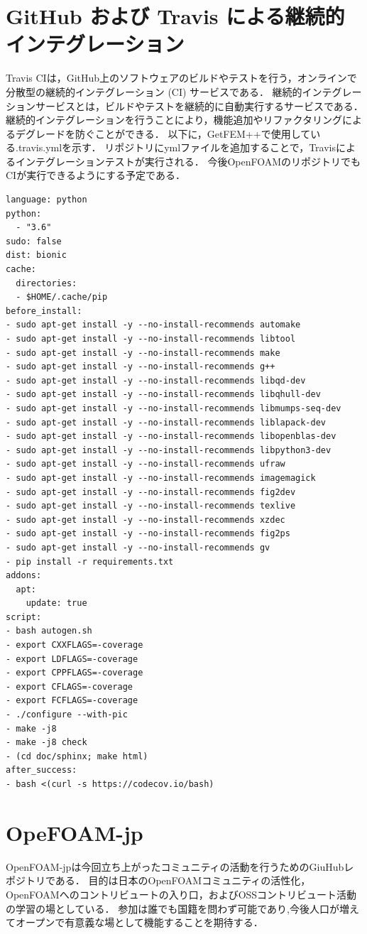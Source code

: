 \documentclass{ltjoc}
\begin{document}
\section{GitHub および Travis による継続的インテグレーション}
Travis CIは，GitHub上のソフトウェアのビルドやテストを行う，オンラインで分散型の継続的インテグレーション (CI) サービスである．
継続的インテグレーションサービスとは，ビルドやテストを継続的に自動実行するサービスである．
継続的インテグレーションを行うことにより，機能追加やリファクタリングによるデグレードを防ぐことができる．
以下に，GetFEM++で使用している.travis.ymlを示す．
リポジトリにymlファイルを追加することで，Travisによるインテグレーションテストが実行される．
今後OpenFOAMのリポジトリでもCIが実行できるようにする予定である．
\begin{lstlisting}
language: python
python:
  - "3.6"
sudo: false
dist: bionic
cache:
  directories:
  - $HOME/.cache/pip
before_install:
- sudo apt-get install -y --no-install-recommends automake
- sudo apt-get install -y --no-install-recommends libtool
- sudo apt-get install -y --no-install-recommends make
- sudo apt-get install -y --no-install-recommends g++
- sudo apt-get install -y --no-install-recommends libqd-dev
- sudo apt-get install -y --no-install-recommends libqhull-dev
- sudo apt-get install -y --no-install-recommends libmumps-seq-dev
- sudo apt-get install -y --no-install-recommends liblapack-dev
- sudo apt-get install -y --no-install-recommends libopenblas-dev
- sudo apt-get install -y --no-install-recommends libpython3-dev
- sudo apt-get install -y --no-install-recommends ufraw
- sudo apt-get install -y --no-install-recommends imagemagick
- sudo apt-get install -y --no-install-recommends fig2dev
- sudo apt-get install -y --no-install-recommends texlive
- sudo apt-get install -y --no-install-recommends xzdec
- sudo apt-get install -y --no-install-recommends fig2ps
- sudo apt-get install -y --no-install-recommends gv
- pip install -r requirements.txt
addons:
  apt:
    update: true
script:
- bash autogen.sh
- export CXXFLAGS=-coverage
- export LDFLAGS=-coverage
- export CPPFLAGS=-coverage
- export CFLAGS=-coverage
- export FCFLAGS=-coverage
- ./configure --with-pic
- make -j8
- make -j8 check
- (cd doc/sphinx; make html)
after_success:
- bash <(curl -s https://codecov.io/bash)
\end{lstlisting}

%
\section{OpeFOAM-jp}
OpenFOAM-jp\cite{URL:OpenFOAM-jp}は今回立ち上がったコミュニティの活動を行うためのGiuHubレポジトリである．
目的は日本のOpenFOAMコミュニティの活性化，OpenFOAMへのコントリビュートの入り口，およびOSSコントリビュート活動の学習の場としている．
参加は誰でも国籍を問わず可能であり,今後人口が増えてオープンで有意義な場として機能することを期待する．
%
\end{document}
